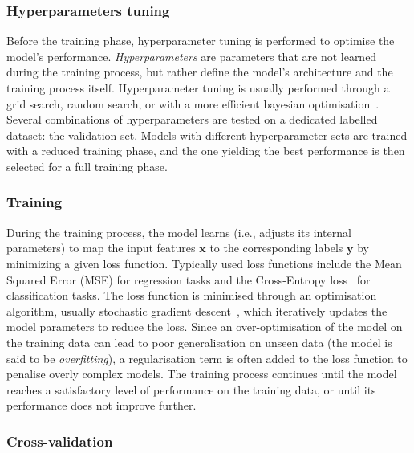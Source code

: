\subsubsection{Hyperparameters tuning}
Before the training phase, hyperparameter tuning is performed to optimise the model's performance. \emph{Hyperparameters} are parameters that are not learned during the training process, but rather define the model's architecture and the training process itself. Hyperparameter tuning is usually performed through a grid search, random search, or with a more efficient bayesian optimisation~\cite{frazier2018tutorial,snoek2012practical,mockus2005bayesian}. Several combinations of hyperparameters are tested on a dedicated labelled dataset: the validation set. Models with different hyperparameter sets are trained with a reduced training phase, and the one yielding the best performance is then selected for a full training phase.

\subsubsection{Training}
During the training process, the model learns (i.e., adjusts its internal parameters) to map the input features $\mathbf{x}$ to the corresponding labels $\mathbf{y}$ by minimizing a given loss function. Typically used loss functions include the Mean Squared Error (MSE) for regression tasks and the Cross-Entropy loss~\cite{mao2023cross} for classification tasks. The loss function is minimised through an optimisation algorithm, usually stochastic gradient descent~\cite{10.1214/aoms/1177729392}, which iteratively updates the model parameters to reduce the loss. Since an over-optimisation of the model on the training data can lead to poor generalisation on unseen data (the model is said to be \emph{overfitting}), a regularisation term is often added to the loss function to penalise overly complex models. The training process continues until the model reaches a satisfactory level of performance on the training data, or until its performance does not improve further. 

\subsubsection{Cross-validation}


